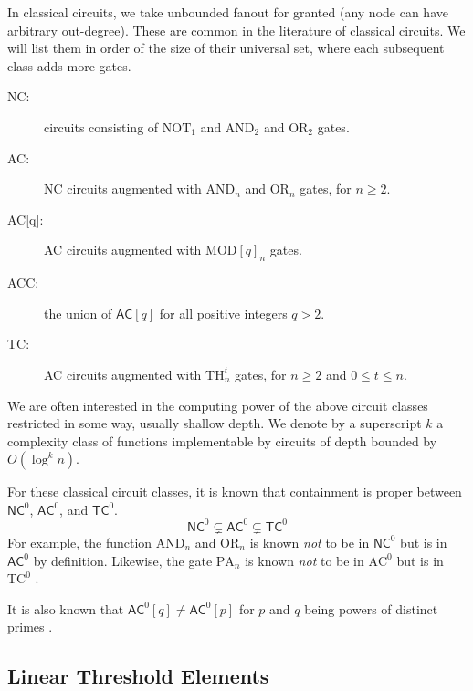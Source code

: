 In classical circuits, we take unbounded fanout
for granted (any node can have arbitrary out-degree). These are common
in the literature of classical circuits. We will list them in order
of the size of their universal set, where each subsequent class adds
more gates.
%
\begin{description}
\item[\textsf{NC}:]
circuits consisting of $\text{NOT}_1$ and $\text{AND}_2$ and
$\text{OR}_2$ gates.
\item[\textsf{AC}:]
\textsf{NC} circuits augmented with $\text{AND}_n$ and $\text{OR}_n$ gates,
for $n \ge 2$.
\item[\textsf{AC[q]}:] \textsf{AC} circuits augmented with $\text{MOD}[q]_n$ gates.
\item[\textsf{ACC}:] the union of $\textsf{AC}[q]$ for all positive integers $q > 2$.
\item[\textsf{TC}:]
\textsf{AC} circuits augmented with $\text{TH}_n^t$ gates, for $n \ge 2$ and
$0 \le t \le n$.
\end{description}
%
We are often interested in the computing power of the above
circuit classes restricted in some way, usually shallow depth.
We denote by a superscript $k$ a complexity class of
functions implementable by circuits of depth bounded by $O(\log^k n)$.

For these classical circuit classes, it is known that containment
is proper between $\textsf{NC}^0$, $\textsf{AC}^0$, and $\textsf{TC}^0$.
%
\begin{equation}
\textsf{NC}^0 \subsetneq \textsf{AC}^0 \subsetneq \textsf{TC}^0
\end{equation}
%
For example, the function $\text{AND}_n$ and $\text{OR}_n$ is known
\emph{not} to be in $\textsf{NC}^0$ but is in $\textsf{AC}^0$ by
definition. Likewise, the gate $\text{PA}_n$ is
known \emph{not} to be in $\text{AC}^0$ but is in 
$\text{TC}^0$ \cite{Bruck1990}.

It is also known that $\textsf{AC}^0[q] \ne \textsf{AC}^0[p]$
for $p$ and $q$ being powers of distinct primes \cite{Smolensky1987}.

\subsection{Linear Threshold Elements}

